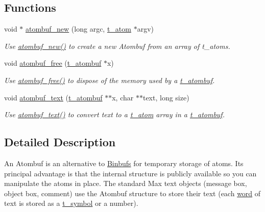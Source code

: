 \subsection*{Functions}
\begin{DoxyCompactItemize}
\item 
void $\ast$ \hyperlink{group__atombuf_ga5748a06a4e11f4be0b90dda8415bc815}{atombuf\_\-new} (long argc, \hyperlink{structt__atom}{t\_\-atom} $\ast$argv)
\begin{DoxyCompactList}\small\item\em Use \hyperlink{group__atombuf_ga5748a06a4e11f4be0b90dda8415bc815}{atombuf\_\-new()} to create a new Atombuf from an array of t\_\-atoms. \item\end{DoxyCompactList}\item 
void \hyperlink{group__atombuf_ga2c10483e31d84a12a037d154bd4051bd}{atombuf\_\-free} (\hyperlink{structt__atombuf}{t\_\-atombuf} $\ast$x)
\begin{DoxyCompactList}\small\item\em Use \hyperlink{group__atombuf_ga2c10483e31d84a12a037d154bd4051bd}{atombuf\_\-free()} to dispose of the memory used by a \hyperlink{structt__atombuf}{t\_\-atombuf}. \item\end{DoxyCompactList}\item 
void \hyperlink{group__atombuf_gada864b7fc2e47dbdbef3176de00924a2}{atombuf\_\-text} (\hyperlink{structt__atombuf}{t\_\-atombuf} $\ast$$\ast$x, char $\ast$$\ast$text, long size)
\begin{DoxyCompactList}\small\item\em Use \hyperlink{group__atombuf_gada864b7fc2e47dbdbef3176de00924a2}{atombuf\_\-text()} to convert text to a \hyperlink{structt__atom}{t\_\-atom} array in a \hyperlink{structt__atombuf}{t\_\-atombuf}. \item\end{DoxyCompactList}\end{DoxyCompactItemize}


\subsection{Detailed Description}
An Atombuf is an alternative to \hyperlink{group__binbuf}{Binbufs} for temporary storage of atoms. Its principal advantage is that the internal structure is publicly available so you can manipulate the atoms in place. The standard Max text objects (message box, object box, comment) use the Atombuf structure to store their text (each \hyperlink{unionword}{word} of text is stored as a \hyperlink{structt__symbol}{t\_\-symbol} or a number). 

